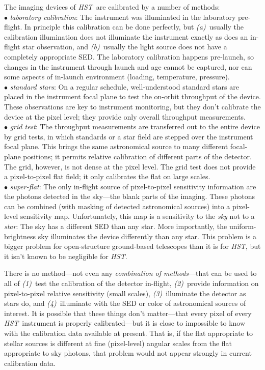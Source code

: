 \documentclass[12pt]{article}
\newcommand{\project}[1]{\textsl{#1}}
\newcommand{\HST}{\project{HST}}
\begin{document}
The imaging devices of \HST\ are calibrated by a number of
methods:
\\ $\bullet$ \project{laboratory calibration}: The instrument was illuminated
  in the laboratory pre-flight.  In principle this calibration can be
  done perfectly, but \textsl{(a)}~usually the calibration
  illumination does not illuminate the instrument exactly as does an
  in-flight star observation, and \textsl{(b)}~usually the light
  source does not have a completely appropriate SED.  The laboratory
  calibration happens pre-launch, so changes in the instrument through
  launch and age cannot be captured, nor can some aspects of in-launch
  environment (loading, temperature, pressure).
\\ $\bullet$ \project{standard stars}: On a regular schedule, well-understood
  standard stars are placed in the instrument focal plane to test the
  on-orbit throughput of the device.  These observations are key to
  instrument monitoring, but they don't calibrate the device at the
  pixel level; they provide only overall throughput measurements.
\\ $\bullet$ \project{grid test}: The throughput measurements are transferred
  out to the entire device by grid tests, in which standards or a star
  field are stepped over the instrument focal plane.  This brings the
  same astronomical source to many different focal-plane positions; it
  permits relative calibration of different parts of the detector.
  The grid, however, is not dense at the pixel level.  The grid test
  does not provide a pixel-to-pixel flat field; it only calibrates the
  flat on large scales.
\\ $\bullet$ \project{super-flat}: The only in-flight source of
  pixel-to-pixel sensitivity information are the photons detected in
  the sky---the blank parts of the imaging.  These photons can be
  combined (with masking of detected astronomical sources) into a
  pixel-level sensitivity map.  Unfortunately, this map is a
  sensitivity to the \emph{sky} not to a \emph{star}: The sky has a
  different SED than any star.  More importantly, the
  uniform-brightness sky illuminates the device differently than any
  star.  This problem is a bigger problem for open-structure
  ground-based telescopes than it is for \HST, but it isn't known
  to be negligible for \HST.

There is no method---not even any \emph{combination of methods}---that
can be used to all of \textsl{(1)}~test the calibration of the
detector in-flight, \textsl{(2)}~provide information on pixel-to-pixel
relative sensitivity (small scales), \textsl{(3)}~illuminate the
detector as stars do, and \textsl{(4)}~illuminate with the SED or
color of astronomical sources of interest.  It is possible that these
things don't matter---that every pixel of every \HST\ instrument is
properly calibrated---but it is close to impossible to know with the
calibration data available at present.  That is, if the flat
appropriate to stellar sources is different at fine (pixel-level)
angular scales from the flat appropriate to sky photons, that problem
would not appear strongly in current calibration data.
\end{document}
